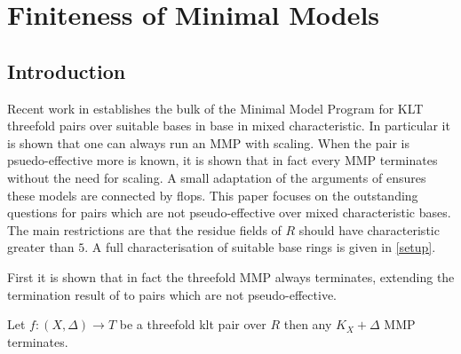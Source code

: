 %
%
%
%
%
%

	\chapter{Finiteness of Minimal Models}
	\section{Introduction}
	
	Recent work in \cite{bhatt2020globally+} establishes the bulk of the Minimal Model Program for KLT threefold pairs over suitable bases in base in mixed characteristic. In particular it is shown that one can always run an MMP with scaling. When the pair is psuedo-effective more is known, it is shown that in fact every MMP terminates without the need for scaling. A small adaptation of the arguments of \cite{kawamata2008flops} ensures these models are connected by flops. This paper focuses on the outstanding questions for pairs which are not pseudo-effective over mixed characteristic bases. The main restrictions are that the residue fields of $R$ should have characteristic greater than $5$. A full characterisation of suitable base rings is given in \autoref{setup}.
	
	
	
	First it is shown that in fact the threefold MMP always terminates, extending the termination result of \cite{bhatt2020globally+} to pairs which are not pseudo-effective.
	
	
	\begin{theorem}
		Let $f:(X,\Delta) \to T$ be a threefold klt pair over $R$ then any $K_{X}+\Delta$ MMP terminates.
	\end{theorem}

